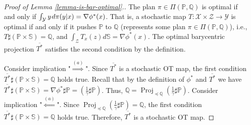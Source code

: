 \documentclass{article} %
\DeclareMathOperator{\Proj}{Proj}
\begin{document}
\begin{proof}[Proof of Lemma \ref{lemma-is-bar-optimal}.]
The plan $\pi\in\Pi(\mathbb{P},\mathbb{Q})$ is optimal if and only if $\int_{\mathcal{Y}}y\hspace{0.3mm}d\pi(y|x)=\nabla\phi^{*}(x)$. That is, a stochastic map $T:\mathcal{X}\times\mathcal{Z}\rightarrow\mathcal{Y}$ is optimal if and only if it pushes $\mathbb{P}$ to $\mathbb{Q}$ (represents some plan $\pi\in\Pi(\mathbb{P},\mathbb{Q})$), i.e., $T\sharp(\mathbb{P}\!\times\!\mathbb{S})=\mathbb{Q}$, and $\int_{\mathcal{Z}}T_{x}(z)d\mathbb{S}=\nabla\phi^{*}(x)$. The optimal barycentric projection $\overline{T^{*}}$ satisfies the second condition by the definition.

Consider implication "$\stackrel{(a)}{\Longrightarrow}$". Since $\overline{T^{*}}$ is a stochastic OT map, the first condition $\overline{T^{*}}\sharp(\mathbb{P}\!\times\!\mathbb{S})=\mathbb{Q}$ holds true. Recall that by the definition of $\phi^{*}$ and $\overline{T^{*}}$ we have $\overline{T^{*}}\sharp(\mathbb{P}\!\times\!\mathbb{S})=\nabla\phi^{*}\sharp\mathbb{P}=(\frac{1}{\gamma} \sharp\mathbb{P})$. Thus, $\mathbb{Q}=\Proj_{\preceq\mathbb{Q}}(\frac{1}{\gamma} \sharp\mathbb{P})$. 
Consider implication "$\stackrel{(a)}{\Longleftarrow}$". Since $\Proj_{\preceq\mathbb{Q}}(\frac{1}{\gamma} \sharp\mathbb{P})=\mathbb{Q}$, the first condition $\overline{T^{*}}\sharp(\mathbb{P}\!\times\!\mathbb{S})=\mathbb{Q}$ holds true. Therefore, $\overline{T^{*}}$ is a stochastic OT map.


\end{proof}
\end{document}
